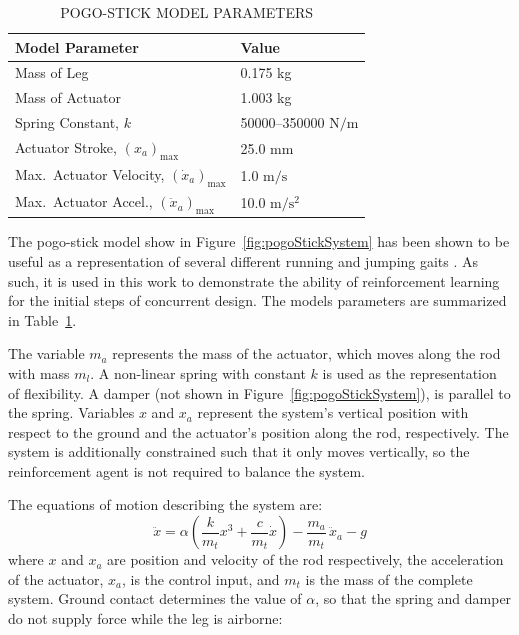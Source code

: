 \documentclass[twocolumn,10pt]{asme2e}
\begin{document}
	\begin{table}[t]
		\caption{POGO-STICK MODEL PARAMETERS}
		\begin{center}
		\label{tab:pogoStickSystem}
			\begin{tabular}{l l}
			\textbf{Model Parameter} & \textbf{Value}\\
			\hline
			\hline
			Mass of Leg & 0.175 kg\\
			Mass of Actuator & 1.003 kg \\
			Spring Constant, $k$ & 50000--350000 $\mbox{N}/\mbox{m}$ \\
			Actuator Stroke, $(x_{a})_{\mbox{max}}$ & 25.0 $\mbox{mm}$ \\
			Max.\ Actuator Velocity, $(\dot{x}_{a})_{\mbox{max}}$ & 1.0 $\mbox{m}/\mbox{s}$ \\ 
			Max.\ Actuator Accel., $(\ddot{x}_{a})_{\mbox{max}}$ & 10.0 $\mbox{m}/\mbox{s}^2$\\
			\end{tabular}
		\end{center}
		\vspace{-0.2in}
	\end{table}

The pogo-stick model show in Figure~\ref{fig:pogoStickSystem} has been shown to be useful as a representation of several different running and jumping gaits \cite{Blickhan1993a}. As such, it is used in this work to demonstrate the ability of reinforcement learning for the initial steps of concurrent design. The models parameters are summarized in Table~\ref{tab:pogoStickSystem}. 
	
The variable $m_a$ represents the mass of the actuator, which moves along the rod with mass $m_l$. A non-linear spring with constant $k$ is used as the representation of flexibility. A damper (not shown in Figure~\ref{fig:pogoStickSystem}), is parallel to the spring. Variables $x$ and $x_a$ represent the system's vertical position with respect to the ground and the actuator's position along the rod, respectively. The system is additionally constrained such that it only moves vertically, so the reinforcement agent is not required to balance the system.
	
The equations of motion describing the system are:
%	
\begin{equation}
		\ddot{x} = \alpha \left(\frac{k}{m_t}x^3+\frac{c}{m_t}\dot{x}\right)-\frac{m_a}{m_t}\,\ddot{x}_a-g
\end{equation}
%
where $x$ and $x_a$ are position and velocity of the rod respectively, the acceleration of the actuator, $x_a$, is the control input, and $m_t$ is the mass of the complete system. Ground contact determines the value of $\alpha$, so that the spring and damper do not supply force while the leg is airborne:
\end{document}
